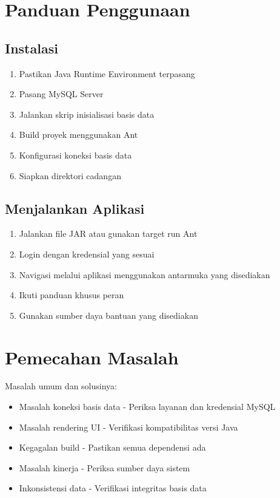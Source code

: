 \documentclass[12pt,a4paper]{article}
\begin{document}
\section{Panduan Penggunaan}

\subsection{Instalasi}
\begin{enumerate}
    \item Pastikan Java Runtime Environment terpasang
    \item Pasang MySQL Server
    \item Jalankan skrip inisialisasi basis data
    \item Build proyek menggunakan Ant
    \item Konfigurasi koneksi basis data
    \item Siapkan direktori cadangan
\end{enumerate}

\subsection{Menjalankan Aplikasi}
\begin{enumerate}
    \item Jalankan file JAR atau gunakan target run Ant
    \item Login dengan kredensial yang sesuai
    \item Navigasi melalui aplikasi menggunakan antarmuka yang disediakan
    \item Ikuti panduan khusus peran
    \item Gunakan sumber daya bantuan yang disediakan
\end{enumerate}

\section{Pemecahan Masalah}
Masalah umum dan solusinya:
\begin{itemize}
    \item Masalah koneksi basis data - Periksa layanan dan kredensial MySQL
    \item Masalah rendering UI - Verifikasi kompatibilitas versi Java
    \item Kegagalan build - Pastikan semua dependensi ada
    \item Masalah kinerja - Periksa sumber daya sistem
    \item Inkonsistensi data - Verifikasi integritas basis data
\end{itemize}
\end{document}
